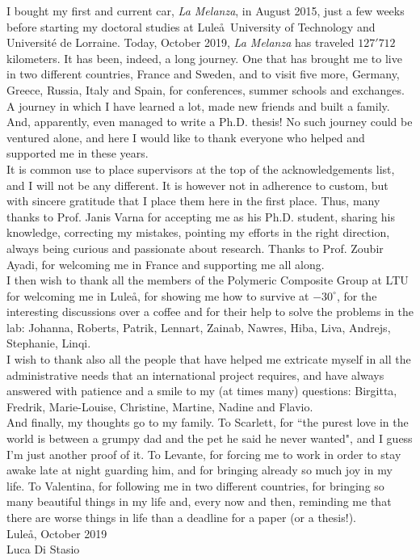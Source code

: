 I bought my first and current car, \emph{La Melanza}, in August 2015, just a few weeks before starting my doctoral studies at Lule\aa\ University of Technology and Universit\'e de Lorraine. Today, October 2019, \emph{La Melanza} has traveled $127'712$ kilometers. It has been, indeed, a long journey. One that has brought me to live in two different countries, France and Sweden, and to visit five more, Germany, Greece, Russia, Italy and Spain, for conferences, summer schools and exchanges. A journey in which I have learned a lot, made new friends and built a family. And, apparently, even managed to write a Ph.D. thesis! No such journey could be ventured alone, and here I would like to thank everyone who helped and supported me in these years.\\
It is common use to place supervisors at the top of the acknowledgements list, and I will not be any different. It is however not in adherence to custom, but with sincere gratitude that I place them here in the first place. Thus, many thanks to Prof. Janis Varna for accepting me as his Ph.D. student, sharing his knowledge, correcting my mistakes, pointing my efforts in the right direction, always being curious and passionate about research. Thanks to Prof. Zoubir Ayadi, for welcoming me in France and supporting me all along.\\
I then wish to thank all the members of the Polymeric Composite Group at LTU for welcoming me in Lule\aa, for showing me how to survive at $-30^{\circ}$, for the interesting discussions over a coffee and for their help to solve the problems in the lab: Johanna, Roberts, Patrik, Lennart, Zainab, Nawres, Hiba, Liva, Andrejs, Stephanie, Linqi.\\
I wish to thank also all the people that have helped me extricate myself in all the administrative needs that an international project requires, and have always answered with patience and a smile to my (at times many) questions: Birgitta, Fredrik, Marie-Louise, Christine, Martine, Nadine and Flavio.\\
And finally, my thoughts go to my family. To Scarlett, for ``the purest love in the world is between a grumpy dad and the pet he said he never wanted", and I guess I'm just another proof of it. To Levante, for forcing me to work in order to stay awake late at night guarding him, and for bringing already so much joy in my life. To Valentina, for following me in two different countries, for bringing so many beautiful things in my life and, every now and then, reminding me that there are worse things in life than a deadline for a paper (or a thesis!).\\

\noindent Lule\aa, October 2019\\
Luca Di Stasio
